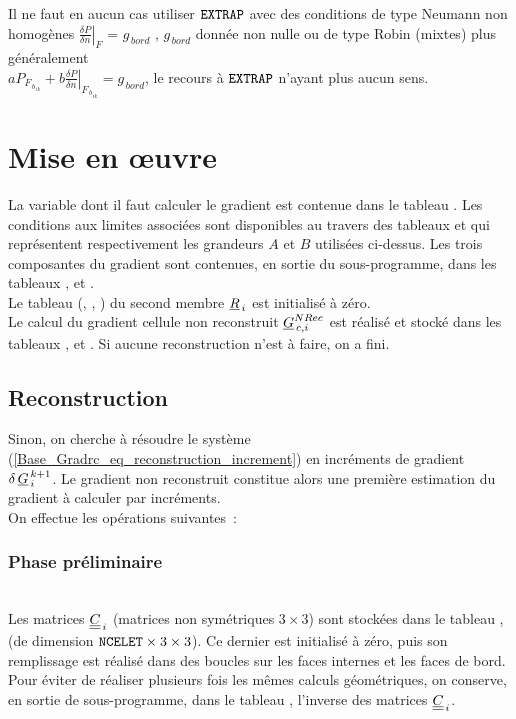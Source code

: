 {Il ne faut en aucun cas utiliser $\text{\texttt{EXTRAP}}$ avec des conditions de type
Neumann non homog\`enes $\left. \displaystyle\frac{\delta P}{\delta
n}\right|_{F}$ = $g_{\,bord}$ , $g_{\,bord}$ donn\'ee non nulle ou de type
Robin (mixtes) plus g\'en\'eralement \\ $a P_{F_{\,b_{\,ik}}} + b \left. \displaystyle\frac{\delta
P}{\delta n}\right|_{F_{\,b_{\,ik}}} = g_{\,bord}$, le recours \`a  $
\text{\texttt{EXTRAP}}$ n'ayant plus aucun sens.

\section{Mise en \oe uvre}


La variable dont il faut calculer le gradient est contenue dans le tableau
. Les conditions aux limites associ\'ees sont disponibles au travers
des tableaux  et  qui repr\'esentent respectivement les
grandeurs $A$ et $B$ utilis\'ees ci-dessus. Les trois composantes du gradient
sont contenues, en sortie du sous-programme, dans les tableaux ,
 et .\\

Le tableau (, , ) du second membre $\underline{R}_{\,i}$ est initialis\'e \`a
z\'ero.\\
Le calcul du gradient cellule non reconstruit $\underline{G}^{NRec}_{\,c,i}$ est
r\'ealis\'e et stock\'e dans les tableaux ,  et . Si
aucune reconstruction n'est \`a faire, on a fini.\\
\hspace*{1cm}\subsection{\bf  Reconstruction}
Sinon, on cherche \`a r\'esoudre le syst\`eme (\ref{Base_Gradrc_eq_reconstruction_increment}) en incr\'ements de
gradient ${\delta\,\underline{G}}^{\,k+1}_{\,i}$. Le gradient non reconstruit
constitue alors une premi\`ere estimation du gradient \`a calculer par
incr\'ements.\\
On effectue les op\'erations suivantes~:
\hspace*{1cm}\subsubsection{\bf Phase pr\'eliminaire}
\hspace*{1,5cm}{\bf Calcul de la matrice, hors boucle en $k$}\\
Les  matrices $\underline{\underline{C}}_{\,i}$ (matrices non sym\'etriques $3\times 3$) sont
stock\'ees dans le tableau ,
(de dimension $\text{\ensuremath{\text{\texttt{NCELET}}}}\times 3\times 3$). Ce dernier est initialis\'e \`a z\'ero,
puis son remplissage est r\'ealis\'e dans des boucles sur les faces internes et
les faces de bord. Pour \'eviter de r\'ealiser plusieurs fois les m\^emes
calculs g\'eom\'etriques, on conserve, en sortie de sous-programme, dans le
tableau , l'inverse des  matrices $\underline{\underline{C}}_{\,i}$.


}
